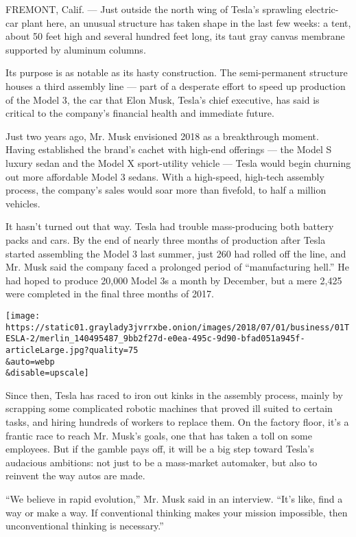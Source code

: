 FREMONT, Calif. --- Just outside the north wing of Tesla's sprawling
electric-car plant here, an unusual structure has taken shape in the
last few weeks: a tent, about 50 feet high and several hundred feet
long, its taut gray canvas membrane supported by aluminum columns.

Its purpose is as notable as its hasty construction. The semi-permanent
structure houses a third assembly line --- part of a desperate effort to
speed up production of the Model 3, the car that Elon Musk, Tesla's
chief executive, has said is critical to the company's financial health
and immediate future.

Just two years ago, Mr. Musk envisioned 2018 as a breakthrough moment.
Having established the brand's cachet with high-end offerings --- the
Model S luxury sedan and the Model X sport-utility vehicle --- Tesla
would begin churning out more affordable Model 3 sedans. With a
high-speed, high-tech assembly process, the company's sales would soar
more than fivefold, to half a million vehicles.

It hasn't turned out that way. Tesla had trouble mass-producing both
battery packs and cars. By the end of nearly three months of production
after Tesla started assembling the Model 3 last summer, just 260 had
rolled off the line, and Mr. Musk said the company faced a prolonged
period of ``manufacturing hell.'' He had hoped to produce 20,000 Model
3s a month by December, but a mere 2,425 were completed in the final
three months of 2017.

\texttt{[image: https://static01.graylady3jvrrxbe.onion/images/2018/07/01/business/01TESLA-2/merlin\_140495487\_9bb2f27d-e0ea-495c-9d90-bfad051a945f-articleLarge.jpg?quality=75\\\&auto=webp\\\&disable=upscale]}

Since then, Tesla has raced to iron out kinks in the assembly process,
mainly by scrapping some complicated robotic machines that proved ill
suited to certain tasks, and hiring hundreds of workers to replace them.
On the factory floor, it's a frantic race to reach Mr. Musk's goals, one
that has taken a toll on some employees. But if the gamble pays off, it
will be a big step toward Tesla's audacious ambitions: not just to be a
mass-market automaker, but also to reinvent the way autos are made.

``We believe in rapid evolution,'' Mr. Musk said in an interview. ``It's
like, find a way or make a way. If conventional thinking makes your
mission impossible, then unconventional thinking is necessary.''

